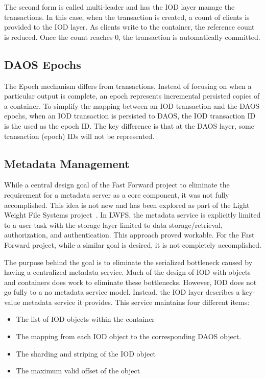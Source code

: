 \documentclass[conference]{sig-alt-gov2}
\begin{document}
The second form is called multi-leader and has the IOD layer manage the
transactions. In this case, when the transaction is created, a count of clients
is provided to the IOD layer. As clients write to the container, the reference
count is reduced. Once the count reaches 0, the transaction is automatically
committed.

\subsection{DAOS Epochs}
The Epoch mechanism differs from transactions. Instead of focusing on when a
particular output is complete, an epoch represents incremental persisted copies
of a container. To simplify the mapping between an IOD transaction and the DAOS
epochs, when an IOD transaction is persisted to DAOS, the IOD transaction ID is
the used as the epoch ID. The key difference is that at the DAOS layer, some
transaction (epoch) IDs will not be represented.

\subsection{Metadata Management}
While a central design goal of the Fast Forward project to eliminate the
requirement for a metadata server as a core component, it was not fully
accomplished.  This idea is not new and has been explored as part of the Light
Weight File Systems project~\cite{oldfield:lwfs}. In LWFS, the metadata service
is explicitly limited to a user task with the storage layer limited to data
storage/retrieval, authorization, and authentication. This approach proved
workable. For the Fast Forward project, while a similar goal is desired, it is
not completely accomplished.

The purpose behind the goal is to eliminate the serialized bottleneck caused by
having a centralized metadata service. Much of the design of IOD with objects
and containers does work to eliminate these bottlenecks.  However, IOD does not
go fully to a no metadata service model. Instead, the IOD layer describes a
key-value metadata service it provides. This service maintains four different
items:

\begin{itemize}
\item The list of IOD objects within the container
\item The mapping from each IOD object to the corresponding DAOS object.
\item The sharding and striping of the IOD object
\item The maximum valid offset of the object
\end{itemize}
\end{document}
